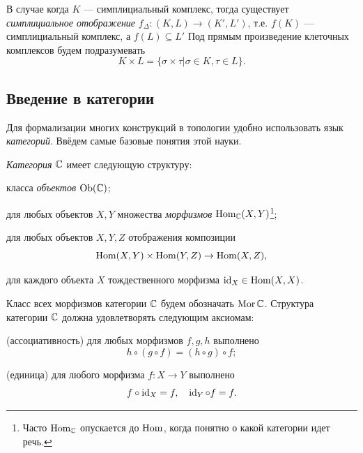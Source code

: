 \documentclass[10pt, twoside]{article}
\begin{document}
В случае когда $K$ --- симплициальный комплекс, тогда существует \emph{симплициальное отображение} $f_{\Delta}\colon (K, L) \to (K', L')$, т.е. $f(K)$ --- симплициальный комплекс, а $f(L) \subseteq L'$
Под прямым произведение клеточных комплексов будем подразумевать $$K \times L = \{\sigma \times \tau | \sigma \in K , \tau \in L\}.$$



\subsection{Введение в категории}
Для формализации многих конструкций в топологии удобно использовать язык \emph{категорий}. Ввёдем самые базовые понятия этой науки.

\begin{definition}
\emph{Категория} $\mathbb C$ имеет следующую структуру:
\begin{conditions}
    \item класса \emph{объектов} $\operatorname{Ob}(\mathbb C)$;
    \item для любых объектов $X, Y$ множества \emph{морфизмов} $\operatorname{Hom}_{\mathbb C}(X, Y)$\footnote{Часто $\operatorname{Hom}_\mathbb C$ опускается до $\operatorname{Hom}$, когда понятно о какой категории идет речь.};
    \item для любых объектов $X, Y, Z$ отображения композиции
    \[
        \operatorname{Hom}(X,Y) \times \operatorname{Hom}(Y,Z) \to \operatorname{Hom}(X,Z),
    \]
    \item для каждого объекта $X$ тождественного морфизма $\operatorname{id}_X \in \operatorname{Hom}(X,X)$.
\end{conditions}
Класс всех морфизмов категории $\mathbb C$ будем обозначать $\operatorname{Mor}\mathbb C$.
Структура категории $\mathbb C$ должна удовлетворять следующим аксиомам:
\begin{conditions}
    \item (ассоциативность) для любых морфизмов $f, g, h$ выполнено
    \[
        h \circ (g \circ f) = (h \circ g) \circ f;
    \]
    \item (единица) для любого морфизма $f : X \to Y$ выполнено
    \[
        f \circ \operatorname{id}_X = f, \quad \operatorname{id}_Y \circ f = f.
    \]
\end{conditions}
\end{definition}
\end{document}

